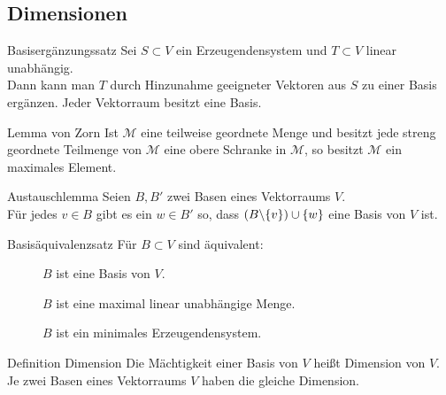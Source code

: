 \documentclass[main.tex]{subfiles}
\begin{document}
\subsection*{Dimensionen}
\begin{karte}{Basisergänzungssatz}
    Sei \(S \subset V\) ein Erzeugendensystem und \(T \subset V\)
    linear unabhängig. \\
    Dann kann man \(T\) durch Hinzunahme geeigneter Vektoren aus \(S\)
    zu einer Basis ergänzen.
    Jeder Vektorraum besitzt eine Basis. 
\end{karte}
\begin{karte}{Lemma von Zorn}
    Ist \(\mathcal{M}\) eine teilweise geordnete Menge und besitzt
    jede streng geordnete Teilmenge von \(\mathcal{M}\) eine obere 
    Schranke in \(\mathcal{M}\), so besitzt \(\mathcal{M}\) 
    ein maximales Element.
\end{karte}
\begin{karte}{Austauschlemma}
    Seien \(B, B'\) zwei Basen eines Vektorraums \(V\). \\ 
    Für jedes \(v \in B \) gibt es ein \(w \in B'\) so, 
    dass \((B \backslash \{v\}) \cup \{w\}\) 
    eine Basis von \(V\) ist.
\end{karte}
\begin{karte}{Basisäquivalenzsatz}
    Für \(B \subset V\) sind äquivalent: 
    \begin{description}
        \item[] \(B\) ist eine Basis von \(V\).
        \item[] \(B\) ist eine maximal linear unabhängige Menge.
        \item[] \(B\) ist ein minimales Erzeugendensystem.
    \end{description}
\end{karte}
\begin{karte}{Definition Dimension}
    Die Mächtigkeit einer Basis von \(V\) heißt Dimension von \(V\). \\ 
    Je zwei Basen eines Vektorraums \(V\) haben die gleiche Dimension.
\end{karte}
\end{document}
